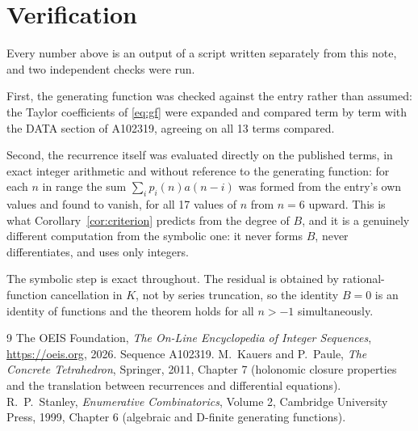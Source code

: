 \documentclass[11pt,a4paper]{article}
\theoremstyle{plain}
\theoremstyle{definition}
\begin{document}
\section{Verification}

Every number above is an output of a script written separately from this note, and two
independent checks were run.

First, the generating function was checked against the entry rather than assumed: the
Taylor coefficients of \eqref{eq:gf} were expanded and compared term by term with the DATA
section of A102319, agreeing on all 13 terms compared.

Second, the recurrence itself was evaluated directly on the published terms, in exact
integer arithmetic and without reference to the generating function: for each $n$ in range
the sum $\sum_{i}p_{i}(n)a(n-i)$ was formed from the entry's own values and found to
vanish, for all 17 values of $n$ from $n=6$ upward. This is what
Corollary~\ref{cor:criterion} predicts from the degree of $B$, and it is a genuinely
different computation from the symbolic one: it never forms $B$, never differentiates, and
uses only integers.

The symbolic step is exact throughout. The residual is obtained by rational-function
cancellation in $K$, not by series truncation, so the identity $B=0$ is an
identity of functions and the theorem holds for all $n>-1$ simultaneously.

\begin{thebibliography}{9}
 The OEIS Foundation, \emph{The On-Line Encyclopedia of Integer Sequences},
\url{https://oeis.org}, 2026. Sequence A102319.
 M.~Kauers and P.~Paule, \emph{The Concrete Tetrahedron}, Springer, 2011,
Chapter 7 (holonomic closure properties and the translation between recurrences and
differential equations).
 R.~P.~Stanley, \emph{Enumerative Combinatorics}, Volume 2, Cambridge
University Press, 1999, Chapter 6 (algebraic and D-finite generating functions).
\end{thebibliography}
\end{document}

